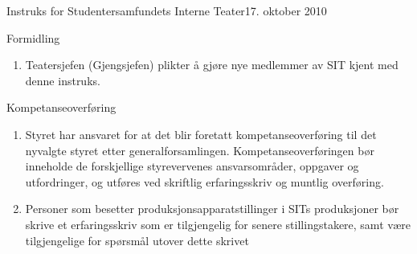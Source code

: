 \begin{instruks}{Instruks for Studentersamfundets Interne Teater}{17. oktober 2010}{ }
	\begin{instruksledd}{Formidling}
		\begin{enumerate}
			\item Teatersjefen (Gjengsjefen) plikter å gjøre nye medlemmer av SIT kjent med
				denne instruks.
		\end{enumerate}
	\end{instruksledd}

	\begin{instruksledd}{Kompetanseoverføring}
		\begin{enumerate}
			\item Styret har ansvaret for at det blir foretatt kompetanseoverføring til det
				nyvalgte styret etter generalforsamlingen. Kompetanseoverføringen bør inneholde de forskjellige
				styrevervenes ansvarsområder, oppgaver og utfordringer, og utføres ved skriftlig erfaringsskriv og
				muntlig overføring.
			\item Personer som besetter produksjonsapparatstillinger i SITs produksjoner bør
				skrive et erfaringsskriv som er tilgjengelig for senere stillingstakere, samt være tilgjengelige for
				spørsmål utover dette skrivet	
		\end{enumerate}
	\end{instruksledd}


\end{instruks}


